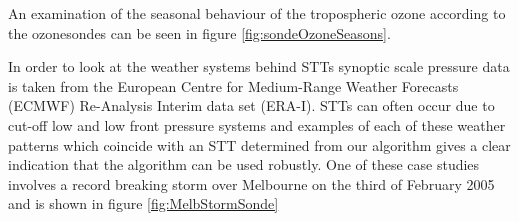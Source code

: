 An examination of the seasonal behaviour of the tropospheric ozone according to the ozonesondes can be seen in figure \ref{fig:sondeOzoneSeasons}.

In order to look at the weather systems behind STTs synoptic scale pressure data is taken from the European Centre for Medium-Range Weather Forecasts (ECMWF) Re-Analysis Interim data set (ERA-I).
STTs can often occur due to cut-off low and low front pressure systems and examples of each of these weather patterns which coincide with an STT determined from our algorithm gives a clear indication that the algorithm can be used robustly.
One of these case studies involves a record breaking storm over Melbourne on the third of February 2005 and is shown in figure \ref{fig:MelbStormSonde}
